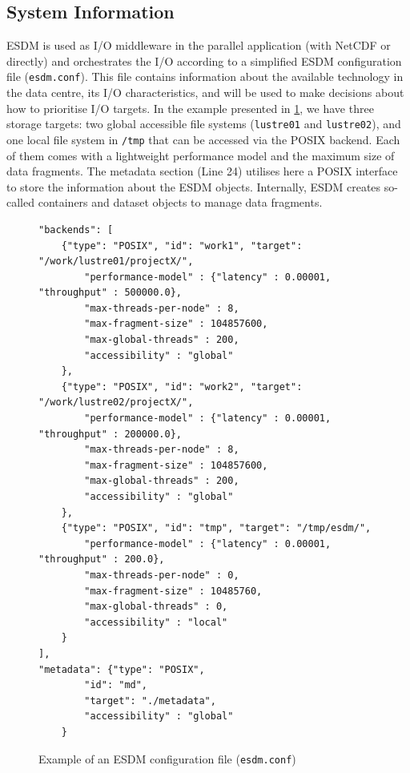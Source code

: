 \documentclass{superfri}
\begin{document}
\subsection{System Information}

ESDM is used as I/O middleware in the parallel application (with NetCDF or directly) and orchestrates the I/O according to a simplified ESDM configuration file (\texttt{esdm.conf}).
This file contains information about the available technology in the data centre, its I/O characteristics, and will be used to make decisions about how to prioritise I/O targets.
In the example presented in \cref{lst:esdm.conf}, we have three storage targets: two global accessible file systems (\texttt{lustre01} and \texttt{lustre02}), and one local file system in \texttt{/tmp} that can be accessed via the POSIX backend.
Each of them comes with a lightweight performance model and the maximum size of data fragments.
The metadata section (Line 24) utilises here a POSIX interface to store the information about the ESDM objects. Internally, ESDM creates so-called containers and dataset objects to manage data fragments.

\begin{figure}[!ht]

\begin{lstlisting}
"backends": [
    {"type": "POSIX", "id": "work1", "target": "/work/lustre01/projectX/",
        "performance-model" : {"latency" : 0.00001, "throughput" : 500000.0},
        "max-threads-per-node" : 8,
        "max-fragment-size" : 104857600,
        "max-global-threads" : 200,
        "accessibility" : "global"
    },
    {"type": "POSIX", "id": "work2", "target": "/work/lustre02/projectX/",
        "performance-model" : {"latency" : 0.00001, "throughput" : 200000.0},
        "max-threads-per-node" : 8,
        "max-fragment-size" : 104857600,
        "max-global-threads" : 200,
        "accessibility" : "global"
    },
    {"type": "POSIX", "id": "tmp", "target": "/tmp/esdm/",
        "performance-model" : {"latency" : 0.00001, "throughput" : 200.0},
        "max-threads-per-node" : 0,
        "max-fragment-size" : 10485760,
        "max-global-threads" : 0,
        "accessibility" : "local"
    }
],
"metadata": {"type": "POSIX",
        "id": "md",
        "target": "./metadata",
        "accessibility" : "global"
    }
\end{lstlisting}

\caption{Example of an ESDM configuration file (\texttt{esdm.conf})}
\label{lst:esdm.conf}
\end{figure}
\end{document}
